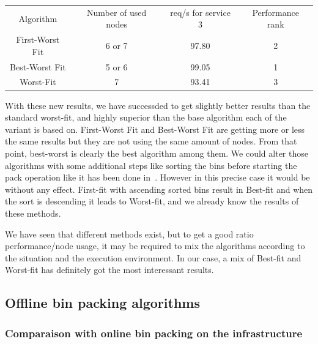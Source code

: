 \vspace{1em}
\begin{tabular}{c | c | c | c}
	Algorithm & Number of used nodes & req/s for service 3 & Performance rank \\
	First-Worst Fit & 6 or 7 & 97.80 & 2 \\
	Best-Worst Fit & 5 or 6 & 99.05 & 1 \\
	Worst-Fit & 7 & 93.41 & 3 \\
\end{tabular}
\vspace{1em}

With these new results, we have successded to get slightly better results than
the standard worst-fit, and highly superior than the base algorithm each of the
variant is based on. First-Worst Fit and Best-Worst Fit are getting more or
less the same results but they are not using the same amount of nodes. From
that point, best-worst is clearly the best algorithm among them.  We could
alter those algorithms with some additional steps like sorting the bins before
starting the pack operation like it has been done
in~\cite{allocationHeterogeneous}.  However in this precise case it would be
without any effect. First-fit with ascending sorted bins result in Best-fit and
when the sort is descending it leads to Worst-fit, and we already know the
results of these methods.

We have seen that different methods exist, but to get a good ratio
performance/node usage, it may be required to mix the algorithms according to
the situation and the execution environment.  In our case, a mix of Best-fit
and Worst-fit has definitely got the most interessant results.

\subsection{Offline bin packing algorithms}

\subsubsection{Comparaison with online bin packing on the infrastructure}


